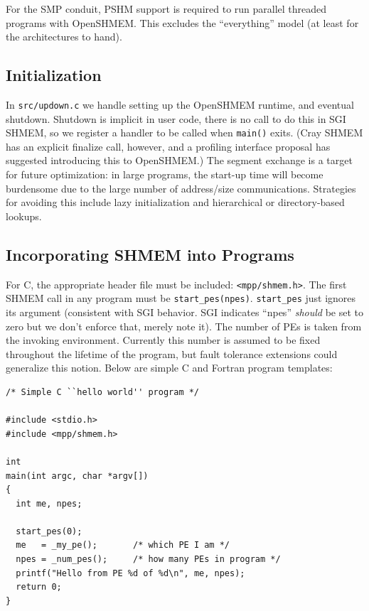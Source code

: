 \documentclass[english]{article}
\begin{document}
For the SMP conduit, PSHM support is required to run parallel threaded
programs with OpenSHMEM. This excludes the ``everything'' model (at
least for the architectures to hand).

\subsection{Initialization}

In \texttt{src/updown.c} we handle setting up the OpenSHMEM runtime,
and eventual shutdown. Shutdown is implicit in user code, there is no
call to do this in SGI SHMEM, so we register a handler to be called
when \texttt{main()} exits. (Cray SHMEM has an explicit finalize call,
however, and a profiling interface proposal has suggested introducing
this to OpenSHMEM.) The segment exchange is a target for future
optimization: in large programs, the start-up time will become
burdensome due to the large number of address/size
communications. Strategies for avoiding this include lazy
initialization and hierarchical or directory-based lookups.

\subsection{Incorporating SHMEM into Programs}

For C, the appropriate header file must be included:
\texttt{<mpp/shmem.h>}.  The first SHMEM call in any program must be
\texttt{start\_pes(npes)}.  \texttt{start\_pes} just ignores its argument
(consistent with SGI behavior. SGI indicates ``npes'' \emph{should} be
set to zero but we don't enforce that, merely note it). The number of
PEs is taken from the invoking environment. Currently this number is
assumed to be fixed throughout the lifetime of the program, but fault
tolerance extensions could generalize this notion. Below are simple C
and Fortran program templates:

\vspace{0.1in}
\begin{minipage}{\linewidth}
\begin{lstlisting}
/* Simple C ``hello world'' program */

#include <stdio.h>
#include <mpp/shmem.h>

int
main(int argc, char *argv[])
{
  int me, npes;

  start_pes(0);
  me   = _my_pe();       /* which PE I am */
  npes = _num_pes();     /* how many PEs in program */
  printf("Hello from PE %d of %d\n", me, npes);
  return 0;
}
\end{lstlisting}
\end{minipage}
\end{document}
